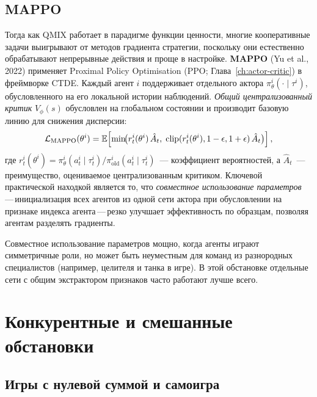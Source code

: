 \subsection{MAPPO}

Тогда как QMIX работает в парадигме функции ценности, многие кооперативные
задачи выигрывают от методов градиента стратегии, поскольку они естественно обрабатывают
непрерывные действия и проще в настройке. \textbf{MAPPO}
 (Yu et al., 2022) применяет Proximal Policy
Optimisation (PPO; Глава~\ref{ch:actor-critic}) в фреймворке CTDE.
Каждый агент $i$ поддерживает отдельного актора $\pi^i_\theta(\cdot \mid
\tau^i)$, обусловленного на его локальной истории наблюдений. \emph{Общий
централизованный критик} $V_\phi(s)$ обусловлен на глобальном состоянии и
производит базовую линию для снижения дисперсии:
\begin{equation}
\label{eq:mappo-objective}
\mathcal{L}_\mathrm{MAPPO}(\theta^i) =
\operatorname{\mathbb{E}}\!\left[\min\!\bigl(r^i_t(\theta^i)\,\hat{A}_t,\;
  \mathrm{clip}(r^i_t(\theta^i), 1-\epsilon, 1+\epsilon)\,\hat{A}_t
\bigr)\right],
\end{equation}
где $r^i_t(\theta^i) = \pi^i_\theta(a^i_t \mid \tau^i_t) /
\pi^i_{\mathrm{old}}(a^i_t \mid \tau^i_t)$~--- коэффициент вероятностей,
а $\hat{A}_t$~--- преимущество, оцениваемое централизованным критиком.
Ключевой практической находкой является то, что \emph{совместное использование параметров}\,---\,инициализация всех агентов из одной сети актора
при обусловлении на признаке индекса агента\,---\,резко
улучшает эффективность по образцам, позволяя агентам разделять градиенты.

\begin{remark}
Совместное использование параметров мощно, когда агенты играют симметричные роли, но
может быть неуместным для команд из разнородных специалистов (например,
целителя и танка в игре). В этой обстановке отдельные сети с
общим экстрактором признаков часто работают лучше всего.
\end{remark}

\section{Конкурентные и смешанные обстановки}
\label{sec:competitive}

\subsection{Игры с нулевой суммой и самоигра}

